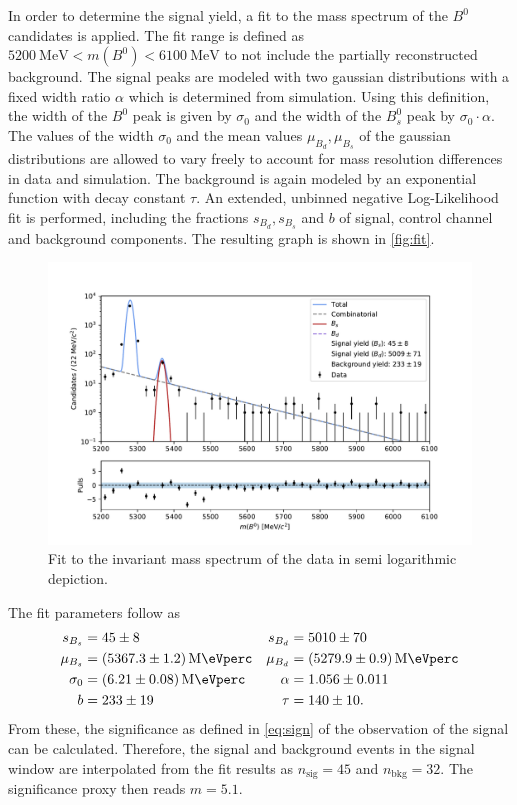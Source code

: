 In order to determine the signal yield, a fit to the mass spectrum of the $B^0$ candidates is applied.
The fit range is defined as $\qty{5200}{\mega\eV} < m(B^0) < \qty{6100}{\mega\eV}$ to not include the partially reconstructed background.
The signal peaks are modeled with two gaussian distributions with a fixed width ratio $\alpha$ which is determined from simulation.
Using this definition, the width of the $B^0$ peak is given by $\sigma_0$ and the width of the $B^0_s$ peak by $\sigma_0 \cdot \alpha$.
The values of the width $\sigma_0$ and the mean values $\mu_{B_d}, \mu_{B_s}$ of the gaussian distributions are allowed to vary freely to account 
for mass resolution differences in data and simulation. 
The background is again modeled by an exponential function with decay constant $\tau$.
An extended, unbinned negative Log-Likelihood fit is performed, including the fractions $s_{B_d}, s_{B_s}$ and $b$ of signal, control channel and background components.
The resulting graph is shown in \autoref{fig:fit}.
\begin{figure}
  \centering
  \includegraphics[width = .9\textwidth]{"content/plots/final_fit.pdf"}
  \caption{Fit to the invariant mass spectrum of the data in semi logarithmic depiction.}
  \label{fig:fit}
\end{figure}
The fit parameters follow as 
\begin{align*}
  s_{B_s} &= \num{45 +- 8} & s_{B_d} &= \num{5010 +- 70} \\
  \mu_{B_s} &= \qty{5367.3 +- 1.2}{\mega\eVperc} & \mu_{B_d} &= \qty{5279.9 +- 0.9}{\mega\eVperc} \\
  \sigma_{0} &=  \qty{6.21 +- 0.08}{\mega\eVperc} & \alpha &=  \num{1.056 +- 0.011} \\
  b &= \num{233 +- 19}  & \tau &= \num{140 +- 10}.
\end{align*}
From these, the significance as defined in \autoref{eq:sign} of the observation of the signal can be calculated.
Therefore, the signal and background events in the signal window are interpolated from the fit results as $n_\text{sig} = \num{45}$ and $n_\text{bkg} = \num{32}$.
The significance proxy then reads $m = \num{5.1}$.
